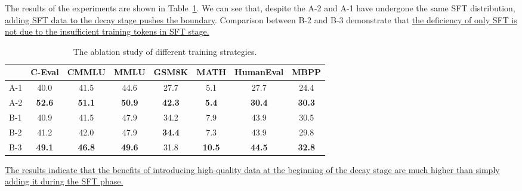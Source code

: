The results of the experiments are shown in Table~\ref{tab:dataexperiments}. We can see that, despite the A-2 and A-1 have undergone the same SFT distribution, \uline{adding SFT data to the decay stage pushes the boundary}. Comparison between B-2 and B-3 demonstrate that \uline{the deficiency of only SFT is not due to the insufficient training tokens in SFT stage.}

\begin{table}[h]
\centering
\begin{tabular}{lccccccc}
\toprule
            & \textbf{C-Eval} & \textbf{CMMLU} & \textbf{MMLU} & \textbf{GSM8K} & \textbf{MATH} & \textbf{HumanEval} & \textbf{MBPP} \\ \midrule
A-1 & 40.0  & 41.5  & 44.6 & 27.7  & 5.1  & 27.7      & 24.4 \\
A-2 & \textbf{52.6}  & \textbf{51.1} & \textbf{50.9} & \textbf{42.3 } & \textbf{5.4}  & \textbf{30.4 }     & \textbf{30.3} \\
\midrule

B-1 &   40.9  & 41.5 & 47.9 &  34.2 & 7.9   &  43.9 & 30.5 \\
B-2 &  41.2 &  42.0 &    47.9  & \textbf{34.4} & 7.3 &  43.9 & 29.8  \\ 
B-3 & \textbf{49.1}  & \textbf{46.8}  & \textbf{49.6} & 31.8  & \textbf{10.5}  & \textbf{44.5}  & \textbf{32.8}\\
\bottomrule
\end{tabular}
\caption{The ablation study of different training strategies.
}
\label{tab:dataexperiments}
\end{table}

\uline{The results indicate that the benefits of introducing high-quality data at the beginning of the decay stage are much higher than simply adding it during the SFT phase.}